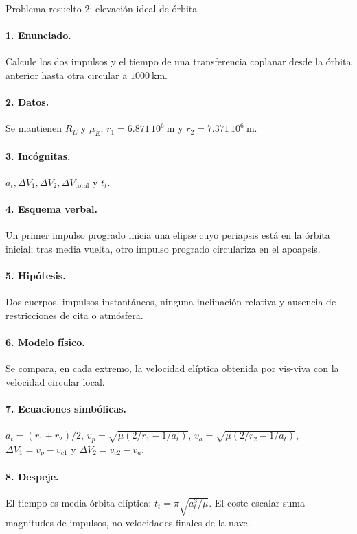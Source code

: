 \begin{studiumworked}{Problema resuelto 2: elevación ideal de órbita}

\paragraph{1. Enunciado.} Calcule los dos impulsos y el tiempo de una transferencia coplanar desde la órbita anterior hasta otra circular a $1000\ \mathrm{km}$.
\paragraph{2. Datos.} Se mantienen $R_E$ y $\mu_E$; $r_1=6.871\,10^6\ \mathrm m$ y $r_2=7.371\,10^6\ \mathrm m$.
\paragraph{3. Incógnitas.} $a_t,\Delta V_1,\Delta V_2,\Delta V_{\mathrm{total}}$ y $t_t$.
\paragraph{4. Esquema verbal.} Un primer impulso progrado inicia una elipse cuyo periapsis está en la órbita inicial; tras media vuelta, otro impulso progrado circulariza en el apoapsis.
\paragraph{5. Hipótesis.} Dos cuerpos, impulsos instantáneos, ninguna inclinación relativa y ausencia de restricciones de cita o atmósfera.
\paragraph{6. Modelo físico.} Se compara, en cada extremo, la velocidad elíptica obtenida por vis-viva con la velocidad circular local.
\paragraph{7. Ecuaciones simbólicas.} $a_t=(r_1+r_2)/2$, $v_p=\sqrt{\mu(2/r_1-1/a_t)}$, $v_a=\sqrt{\mu(2/r_2-1/a_t)}$, $\Delta V_1=v_p-v_{c1}$ y $\Delta V_2=v_{c2}-v_a$.
\paragraph{8. Despeje.} El tiempo es media órbita elíptica: $t_t=\pi\sqrt{a_t^3/\mu}$. El coste escalar suma magnitudes de impulsos, no velocidades finales de la nave.

\end{studiumworked}

